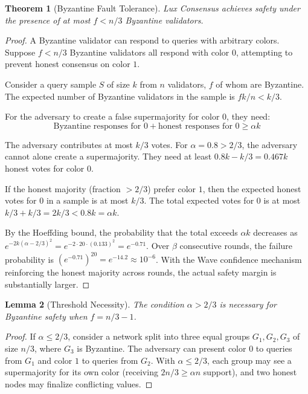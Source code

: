\documentclass[11pt,a4paper]{article}
\newtheorem{theorem}{Theorem}[section]
\newtheorem{lemma}[theorem]{Lemma}
\begin{document}
\begin{theorem}[Byzantine Fault Tolerance]
\label{thm:bft}
Lux Consensus achieves safety under the presence of at most $f < n/3$ Byzantine validators.
\end{theorem}

\begin{proof}
A Byzantine validator can respond to queries with arbitrary colors. Suppose $f < n/3$
Byzantine validators all respond with color $0$, attempting to prevent honest consensus
on color $1$.

Consider a query sample $S$ of size $k$ from $n$ validators, $f$ of whom are Byzantine.
The expected number of Byzantine validators in the sample is $fk/n < k/3$.

For the adversary to create a false supermajority for color $0$, they need:
\begin{equation}
\text{Byzantine responses for } 0 + \text{honest responses for } 0 \geq \alpha k
\end{equation}

The adversary contributes at most $k/3$ votes. For $\alpha = 0.8 > 2/3$, the adversary
cannot alone create a supermajority. They need at least $0.8k - k/3 = 0.467k$ honest
votes for color $0$.

If the honest majority (fraction $> 2/3$) prefer color $1$, then the expected honest
votes for $0$ in a sample is at most $k/3$. The total expected votes for $0$ is at most
$k/3 + k/3 = 2k/3 < 0.8k = \alpha k$.

By the Hoeffding bound, the probability that the total exceeds $\alpha k$ decreases
as $e^{-2k(\alpha - 2/3)^2} = e^{-2 \cdot 20 \cdot (0.133)^2} = e^{-0.71}$. Over $\beta$
consecutive rounds, the failure probability is $(e^{-0.71})^{20} = e^{-14.2} \approx 10^{-6}$.
With the Wave confidence mechanism reinforcing the honest majority across rounds, the
actual safety margin is substantially larger.
\end{proof}

\begin{lemma}[Threshold Necessity]
\label{lem:threshold}
The condition $\alpha > 2/3$ is necessary for Byzantine safety when $f = n/3 - 1$.
\end{lemma}

\begin{proof}
If $\alpha \leq 2/3$, consider a network split into three equal groups $G_1, G_2, G_3$
of size $n/3$, where $G_3$ is Byzantine. The adversary can present color $0$ to queries
from $G_1$ and color $1$ to queries from $G_2$. With $\alpha \leq 2/3$, each group may
see a supermajority for its own color (receiving $2n/3 \geq \alpha n$ support), and two
honest nodes may finalize conflicting values.
\end{proof}
\end{document}
